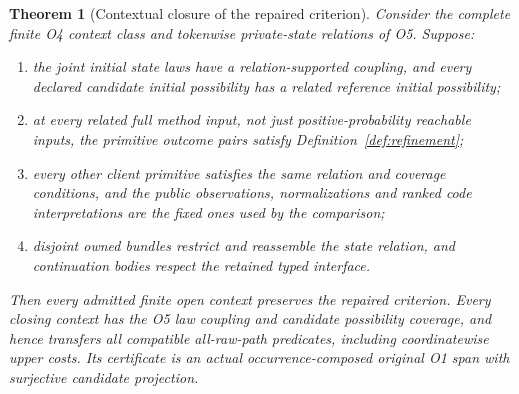 \documentclass[11pt,a4paper]{article}
\newtheorem{theorem}{Theorem}[section]
\theoremstyle{definition}
\begin{document}
\begin{theorem}[Contextual closure of the repaired criterion]
\label{thm:contextual}
Consider the complete finite O4 context class and tokenwise private-state
relations of O5. Suppose:
\begin{enumerate}[label=\textup{(L\arabic*)}]
\item the joint initial state laws have a relation-supported coupling,
and every declared candidate initial possibility has a related reference
initial possibility;
\item at every related full method input, not just positive-probability
reachable inputs, the primitive outcome pairs satisfy
Definition~\ref{def:refinement};
\item every other client primitive satisfies the same relation and
coverage conditions, and the public observations, normalizations and
ranked code interpretations are the fixed ones used by the comparison;
\item disjoint owned bundles restrict and reassemble the state relation,
and continuation bodies respect the retained typed interface.
\end{enumerate}
Then every admitted finite open context preserves the repaired criterion.
Every closing context has the O5 law coupling and candidate possibility
coverage, and hence transfers all compatible all-raw-path predicates,
including coordinatewise upper costs. Its certificate is an actual
occurrence-composed original O1 span with surjective candidate projection.
\end{theorem}
\end{document}
